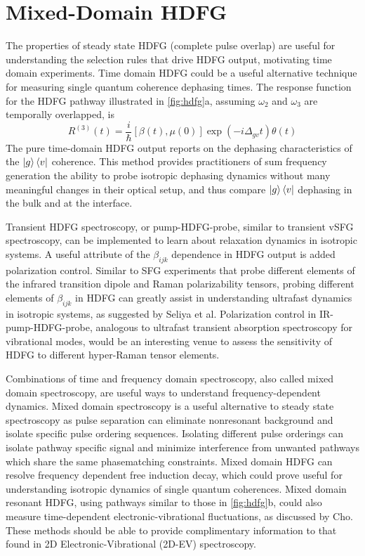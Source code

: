\documentclass[aip, jcp, reprint, onecolumn]{revtex4-2}
\begin{document}
\section{Mixed-Domain HDFG}\label{mixeddomain}
The properties of steady state HDFG (complete pulse overlap) are useful for understanding the selection rules that drive HDFG output, motivating time domain experiments.
Time domain HDFG could be a useful alternative technique for measuring single quantum coherence dephasing times.
The response function for the HDFG pathway illustrated in \autoref{fig:hdfg}a, assuming $\omega_2$ and $\omega_3$ are temporally overlapped, is \cite{RN287, Cho2001}
\begin{equation}
	R^{(3)}(t) = \frac{i}{\hbar} [\beta(t), \mu(0)] \exp(-i\Delta_{gv}t) \theta(t) 
\end{equation}  
The pure time-domain HDFG output reports on the dephasing characteristics of the $\ket{g}\bra{v}$ coherence. 
This method provides practitioners of sum frequency generation the ability to probe isotropic dephasing dynamics without many meaningful changes in their optical setup, and thus compare $\ket{g}\bra{v}$ dephasing in the bulk and at the interface.\cite{RN224}

Transient HDFG spectroscopy, or pump-HDFG-probe, similar to transient vSFG spectroscopy, can be implemented to learn about relaxation dynamics in isotropic systems. \cite{RN224, Bonn2024}
A useful attribute of the $\beta_{ijk}$ dependence in HDFG output is added polarization control. 
Similar to SFG experiments that probe different elements of the infrared transition dipole and Raman polarizability tensors, probing different elements of $\beta_{ijk}$ in HDFG can greatly assist in understanding ultrafast dynamics in isotropic systems, as suggested by Seliya et al. \cite{Shen90, RN224, Bonn2024}
Polarization control in IR-pump-HDFG-probe, analogous to ultrafast transient absorption spectroscopy for vibrational modes, would be an interesting venue to assess the sensitivity of HDFG to different hyper-Raman tensor elements. 

Combinations of time and frequency domain spectroscopy, also called mixed domain spectroscopy, are useful ways to understand frequency-dependent dynamics. \cite{RN135, RN171, RN131}
Mixed domain spectroscopy is a useful alternative to steady state spectroscopy as pulse separation can eliminate nonresonant background and isolate specific pulse ordering sequences. \cite{RN372, RN324, McDonnell2024}
Isolating different pulse orderings can isolate pathway specific signal and minimize interference from unwanted pathways which share the same phasematching constraints. 
Mixed domain HDFG can resolve frequency dependent free induction decay, which could prove useful for understanding isotropic dynamics of single quantum coherences. 
Mixed domain resonant HDFG, using pathways similar to those in \autoref{fig:hdfg}b, could also measure time-dependent electronic-vibrational fluctuations, as discussed by Cho. \cite{Cho2001}
These methods should be able to provide complimentary information to that found in 2D Electronic-Vibrational (2D-EV) spectroscopy. \cite{Dong2015, Lewis2015, Gaynor2017}
\end{document}
